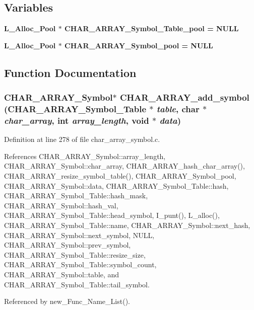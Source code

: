 \subsection*{Variables}
\begin{CompactItemize}
\item 
\bf{L\_\-Alloc\_\-Pool} $\ast$ \bf{CHAR\_\-ARRAY\_\-Symbol\_\-Table\_\-pool} = NULL
\item 
\bf{L\_\-Alloc\_\-Pool} $\ast$ \bf{CHAR\_\-ARRAY\_\-Symbol\_\-pool} = NULL
\end{CompactItemize}


\subsection{Function Documentation}
\subsubsection{\setlength{\rightskip}{0pt plus 5cm}\bf{CHAR\_\-ARRAY\_\-Symbol}$\ast$ CHAR\_\-ARRAY\_\-add\_\-symbol (\bf{CHAR\_\-ARRAY\_\-Symbol\_\-Table} $\ast$ {\em table}, char $\ast$ {\em char\_\-array}, int {\em array\_\-length}, void $\ast$ {\em data})}\label{char__array__symbol_8c_66efa3e6d08af925d3d14d8b870fb6b4}




Definition at line 278 of file char\_\-array\_\-symbol.c.

References CHAR\_\-ARRAY\_\-Symbol::array\_\-length, CHAR\_\-ARRAY\_\-Symbol::char\_\-array, CHAR\_\-ARRAY\_\-hash\_\-char\_\-array(), CHAR\_\-ARRAY\_\-resize\_\-symbol\_\-table(), CHAR\_\-ARRAY\_\-Symbol\_\-pool, CHAR\_\-ARRAY\_\-Symbol::data, CHAR\_\-ARRAY\_\-Symbol\_\-Table::hash, CHAR\_\-ARRAY\_\-Symbol\_\-Table::hash\_\-mask, CHAR\_\-ARRAY\_\-Symbol::hash\_\-val, CHAR\_\-ARRAY\_\-Symbol\_\-Table::head\_\-symbol, I\_\-punt(), L\_\-alloc(), CHAR\_\-ARRAY\_\-Symbol\_\-Table::name, CHAR\_\-ARRAY\_\-Symbol::next\_\-hash, CHAR\_\-ARRAY\_\-Symbol::next\_\-symbol, NULL, CHAR\_\-ARRAY\_\-Symbol::prev\_\-symbol, CHAR\_\-ARRAY\_\-Symbol\_\-Table::resize\_\-size, CHAR\_\-ARRAY\_\-Symbol\_\-Table::symbol\_\-count, CHAR\_\-ARRAY\_\-Symbol::table, and CHAR\_\-ARRAY\_\-Symbol\_\-Table::tail\_\-symbol.

Referenced by new\_\-Func\_\-Name\_\-List().
